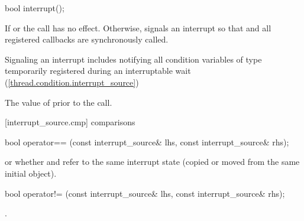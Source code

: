 {%
\begin{itemdecl}
bool interrupt();
\end{itemdecl}
\begin{itemdescr}

  \pnum\effects If  or  the call has no effect. 
                Otherwise, signals an interrupt so that 
                and all registered callbacks are synchronously called.
                \begin{note} Signaling an interrupt includes notifying all condition variables
                             of type 
                             temporarily registered during an interruptable wait (\ref{thread.condition.interrupt_source})
                             \end{note}

  \pnum\postconditions {}

  \pnum\returns The value of  prior to the call.
\end{itemdescr}


[interrupt_source.cmp]{ comparisons}

%
\begin{itemdecl}
bool operator== (const interrupt_source& lhs, const interrupt_source& rhs);
\end{itemdecl}
\begin{itemdescr}
  \pnum\returns {} or
                whether  and  refer to the
                same interrupt state
                (copied or moved from the same initial  object).
\end{itemdescr}

%
\begin{itemdecl}
bool operator!= (const interrupt_source& lhs, const interrupt_source& rhs);
\end{itemdecl}
\begin{itemdescr}
  \pnum\returns {}.
\end{itemdescr}


}
